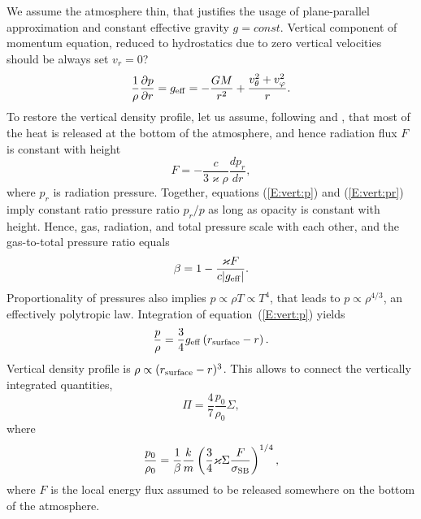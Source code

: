 \documentclass[usenatbib,onecolumn]{mnras}
\newcommand{\alert}[1]{\color{red} #1\color{black}}
\newcommand{\pardir}[2]{\ensuremath{\frac{\partial #2}{\partial #1} }}
\begin{document}
We assume the atmosphere thin, that justifies the usage of plane-parallel
approximation and constant effective gravity $g=const$. Vertical component of
momentum equation, reduced to hydrostatics due to zero vertical velocities
\alert{should be always set $v_r=0$?}
\begin{equation}\label{E:vert:p}
\frac{1}{\rho}\pardir{r}{p}
=g_{\rm eff} = -\frac{GM}{r^2} + \frac{v_\theta^2+v_\varphi^2}{r}.
\end{equation}
To restore the vertical density profile, let us assume, following \citet{IS99}
and \citet{VP06}, that most of the heat is released at the bottom of the
atmosphere, and hence radiation flux $F$ is constant with height
\begin{equation}\label{E:vert:pr}
\displaystyle F = - \frac{c}{3\varkappa \rho} \frac{dp_r}{dr},
\end{equation}
where $p_r$ is radiation pressure.
Together, equations (\ref{E:vert:p}) and (\ref{E:vert:pr}) imply constant
ratio pressure ratio $p_r / p$ as long as opacity is constant with height. 
Hence, gas, radiation, and total pressure scale with each other, and the gas-to-total
pressure ratio equals
\begin{equation}\label{E:vert:beta}
\displaystyle \beta = 1- \frac{\varkappa F }{c|g_{\rm eff}|}.
\end{equation}
Proportionality of pressures also implies $p \propto \rho T \propto T^4$, that
leads to $p\propto \rho^{4/3}$, an effectively polytropic law. Integration of
equation~(\ref{E:vert:p}) yields
\begin{equation}\label{E:vert:prho}
\displaystyle \frac{p}{\rho} = \frac{3}{4} g_{\rm eff} \left( r_{\rm surface} - r \right).
\end{equation}
Vertical density profile is $\rho \propto (r_{\rm surface} - r)^{3}$. This
allows to connect the vertically integrated quantities,
\begin{equation}\label{E:vert:pisigma}
\displaystyle \Pi = \frac{4}{7} \frac{p_0}{\rho_0} \Sigma,
\end{equation}
where
\begin{equation}\label{E:vert:p0rho0}
\frac{p_0}{\rho_0} = \frac{1}{\beta} \frac{k}{m} \left(\frac{3}{4}\varkappa
\Sigma \frac{F}{\sigma_{\rm SB}} \right)^{1/4},
\end{equation}
where $F$ is the local energy flux assumed to be released somewhere on the
bottom of the atmosphere.
\end{document}
